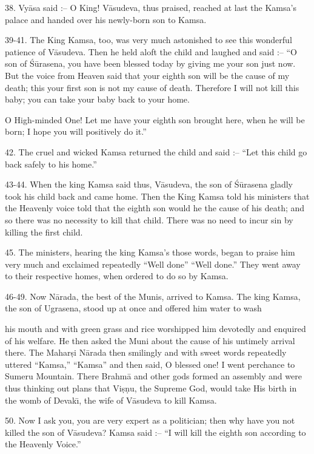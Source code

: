 38. Vy\=asa said :-- O King! V\=asudeva, thus praised, reached at last the Kamsa's palace and handed over his newly-born son to Kamsa.

39-41. The King Kamsa, too, was very much astonished to see this wonderful patience of V\=asudeva. Then he held aloft the child and laughed and said :-- ``O son of \'S\=urasena, you have been blessed today by giving me your son just now. But the voice from Heaven said that your eighth son will be the cause of my death; this your first son is not my cause of death. Therefore I will not kill this baby; you can take your baby back to your home.

O High-minded One! Let me have your eighth son brought here, when he will be born; I hope you will positively do it.''

42. The cruel and wicked Kamsa returned the child and said :-- ``Let this child go back safely to his home.''

43-44. When the king Kamsa said thus, V\=asudeva, the son of \'S\=urasena gladly took his child back and came home. Then the King Kamsa told his ministers that the Heavenly voice told that the eighth son would he the cause of his death; and so there was no necessity to kill that child. There was no need to incur sin by killing the first child.

45. The ministers, hearing the king Kamsa's those words, began to praise him very much and exclaimed repeatedly ``Well done'' ``Well done.'' They went away to their respective homes, when ordered to do so by Kamsa.

46-49. Now N\=arada, the best of the Munis, arrived to Kamsa. The king Kamsa, the son of Ugrasena, stood up at once and offered him water to wash

his mouth and with green grass and rice worshipped him devotedly and enquired of his welfare. He then asked the Muni about the cause of his untimely arrival there. The Mahar\d{s}i N\=arada then smilingly and with sweet words repeatedly uttered ``Kamsa,'' ``Kamsa'' and then said, O blessed one! I went perchance to Sumeru Mountain. There Brahm\=a and other gods formed an assembly and were thus thinking out plans that Vi\d{s}\d{n}u, the Supreme God, would take His birth in the womb of Devak\={\i}, the wife of V\=asudeva to kill Kamsa.

50. Now I ask you, you are very expert as a politician; then why have you not killed the son of V\=asudeva? Kamsa said :-- ``I will kill the eighth son according to the Heavenly Voice.''

